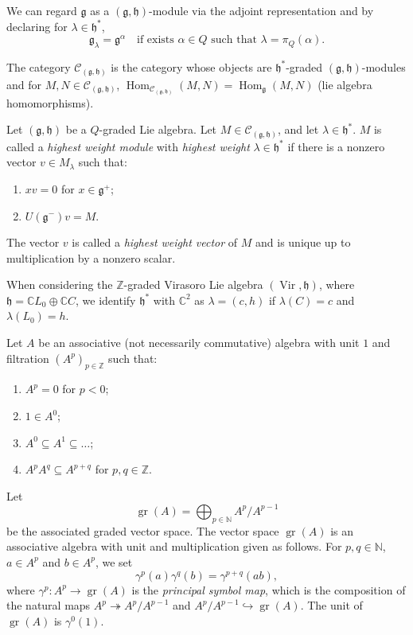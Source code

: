 \documentclass[a4paper, 12pt, reqno]{amsart}
\DeclareMathOperator{\Vir}{Vir}
\DeclareMathOperator{\gr}{gr}
\DeclareMathOperator{\Hom}{Hom}
\begin{document}
We can regard $\mathfrak{g}$ as a $(\mathfrak{g}, \mathfrak{h})$-module via the adjoint representation and by declaring for $\lambda \in \mathfrak{h}^*$,
\begin{equation*}
  \mathfrak{g}_{\lambda} = \mathfrak{g}^{\alpha} \quad \text{if exists $\alpha \in Q$ such that $\lambda = \pi_Q(\alpha)$}.
\end{equation*}

The category $\mathcal{C}_{(\mathfrak{g}, \mathfrak{h})}$ is the category whose objects are $\mathfrak{h}^*$-graded $(\mathfrak{g}, \mathfrak{h})$-modules and for $M, N \in \mathcal{C}_{(\mathfrak{g}, \mathfrak{h})}$, $\Hom_{\mathcal{C}_{(\mathfrak{g}, \mathfrak{h})}}(M, N) = \Hom_{\mathfrak{g}}(M, N)$ (lie algebra homomorphisms).

Let $(\mathfrak{g}, \mathfrak{h})$ be a $Q$-graded Lie algebra.
  Let $M \in \mathcal{C}_{(\mathfrak{g}, \mathfrak{h})}$, and let $\lambda \in \mathfrak{h}^*$.
  $M$ is called a \emph{highest weight module} with \emph{highest weight} $\lambda \in \mathfrak{h}^*$ if there is a nonzero vector $v \in M_{\lambda}$ such that:
  \begin{enumerate}
  \item $xv = 0$ for $x \in \mathfrak{g}^+$;
  \item $U(\mathfrak{g}^-)v = M$.
  \end{enumerate}
  The vector $v$ is called a \emph{highest weight vector} of $M$ and is unique up to multiplication by a nonzero scalar.

  When considering the $\mathbb{Z}$-graded Virasoro Lie algebra $(\Vir, \mathfrak{h})$, where $\mathfrak{h} = \mathbb{C}L_0 \oplus \mathbb{C}C$, we identify $\mathfrak{h}^*$ with $\mathbb{C}^2$ as $\lambda = (c, h)$ if $\lambda(C) = c$ and $\lambda(L_0) = h$.

  Let $A$ be an associative (not necessarily commutative) algebra with unit $1$ and filtration $(A^p)_{p \in \mathbb{Z}}$ such that:
\begin{enumerate}
\item $A^p = 0$ for $p < 0$;
\item $1 \in A^0$;
\item $A^0 \subseteq A^1 \subseteq \dots$;
\item $A^pA^q \subseteq A^{p + q}$ for $p, q \in \mathbb{Z}$.
\end{enumerate}
Let
\begin{equation*}
  \gr(A) = \bigoplus_{p \in \mathbb{N}}A^p/A^{p - 1}
\end{equation*}
be the associated graded vector space.
The vector space $\gr(A)$ is an associative algebra with unit and multiplication given as follows.
For $p, q \in \mathbb{N}$, $a \in A^p$ and $b \in A^p$, we set
\begin{equation*}
  \gamma^p(a)\gamma^q(b) = \gamma^{p + q}(ab),
\end{equation*}
where $\gamma^p: A^p \to \gr(A)$ is the \emph{principal symbol map}, which is the composition of the natural maps $A^p \twoheadrightarrow A^p/A^{p - 1}$ and $A^p/A^{p - 1} \hookrightarrow \gr(A)$.
The unit of $\gr(A)$ is $\gamma^0(1)$.
\end{document}
